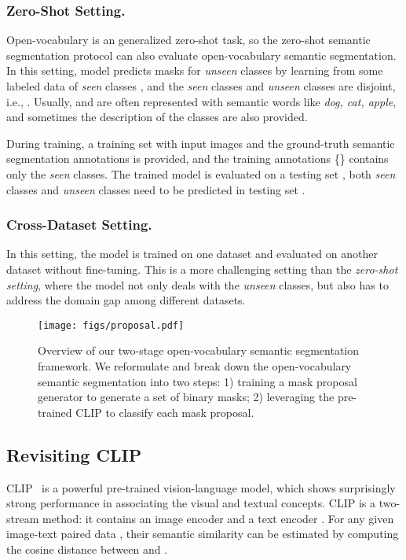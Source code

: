 \documentclass[runningheads]{llncs}
\begin{document}
\subsubsection{Zero-Shot Setting.} Open-vocabulary is an generalized zero-shot task, so the zero-shot semantic segmentation protocol can also evaluate open-vocabulary semantic segmentation. In this setting, model predicts masks for \emph{unseen} classes  by learning from some labeled data of \emph{seen} classes , and the \emph{seen} classes and \emph{unseen} classes are disjoint, i.e., . Usually,  and  are often represented with semantic words like \textit{dog, cat, apple}, and sometimes the description of the classes are also provided. 

During training, a training set  with input images  and the ground-truth semantic segmentation annotations  is provided, and the training annotations \{\} contains only the \emph{seen} classes. The trained model is evaluated on a testing set , both \emph{seen} classes and \emph{unseen} classes need to be predicted in testing set .

\subsubsection{Cross-Dataset Setting.} 
In this setting, the model is trained on one dataset and evaluated on another dataset without fine-tuning. This is a more challenging setting than the \textit{zero-shot setting}, where the model not only deals with the \emph{unseen} classes, but also has to address the domain gap among different datasets.


\begin{figure*}[t]
  \centering
   \texttt{[image: figs/proposal.pdf]}
   \caption{Overview of our two-stage open-vocabulary semantic segmentation framework. We reformulate and break down the open-vocabulary semantic segmentation into two steps: 1) training a mask proposal generator to generate a set of binary masks; 2) leveraging the pre-trained CLIP to classify each mask proposal. }
   \label{fig:proposal}
   \vspace{-1em}
\end{figure*} 

\subsection{Revisiting CLIP}
CLIP~\cite{radford2021learning} is a powerful pre-trained vision-language model, which shows surprisingly strong performance in associating the visual and textual concepts. CLIP is a two-stream method: it contains an image encoder  and a text encoder . For any given image-text paired data  , their semantic similarity can be estimated by computing the cosine distance between  and . 
\end{document}

